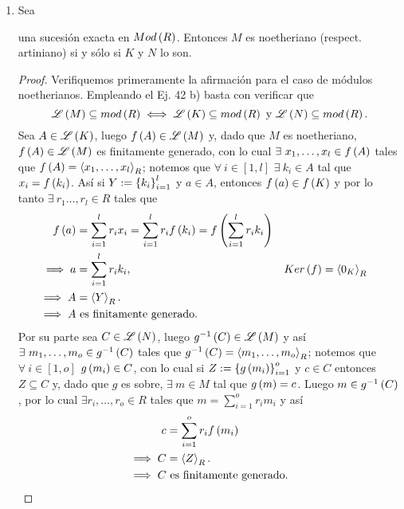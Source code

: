 \documentclass{article}
\begin{document}
\begin{enumerate}[label=\textbf{Ej \arabic*.}]
		\item Sea
		\begin{center}
		\end{center} 
		una sucesión exacta en $Mod\left(R\right)$. Entonces $M$ es noetheriano (respect. artiniano) si y sólo si $K$ y $N$ lo son.
		\begin{proof}
			Verifiquemos primeramente la afirmación para el caso de módulos noetherianos. Empleando el Ej. 42 b) basta con verificar que 
			\begin{equation*}
				\mathscr{L}\left(M\right)\subseteq mod\left(R\right)\iff \mathscr{L}\left(K\right)\subseteq mod\left(R\right)\text{ y }\mathscr{L}\left(N\right)\subseteq mod\left(R\right).
			\end{equation*}
			\boxed{\implies} Sea $A\in\mathscr{L}\left(K\right)$, luego $f\left(A\right)\in\mathscr{L}\left(M\right)$ y, dado que $M$ es noetheriano, $f\left(A\right)\in\mathscr{L}\left(M\right)$ es finitamente generado, con lo cual $\exists\ x_1,\dotsc,x_l\in f\lrprth{A}$ tales que $f\left(A\right)=\left< x_1,\dotsc,x_l\right>_{R}$; notemos que $\forall\ i\in[1,l]$ $\exists\ k_i\in A$ tal que $x_i=f\left(k_i\right)$. Así si $Y:={\left\{{k}_{i}\right\}}_{i=1}^{l}$ y $a\in A$, entonces $f\left(a\right)\in f\left(K\right)$ y por lo tanto $\exists\ r_1\dots,r_l\in R$ tales que
			\begin{align*}
				f\left(a\right)&=\sum_{i=1}^{l}r_ix_i=\sum_{i=1}^{l}r_if\left(k_i\right)=f\left(\sum_{i=1}^{l}r_ik_i\right)\\
				\implies a&=\sum_{i=1}^{l}r_ik_i, && Ker\left(f\right)=\left< 0_K\right>_{R}\\
				\implies A&=\left< Y\right>_{R}.\\
				\implies A&\text{ es finitamente generado}.
			\end{align*} 
			Por su parte sea $C\in\mathscr{L}\left(N\right)$, luego $g^{-1}\left(C\right)\in\mathscr{L}\left(M\right)$ y así $\exists\ m_1,\dotsc,m_o\in g^{-1}\left(C\right)$ tales que $g^{-1}\left(C\right)=\left< m_1,\dotsc,m_o\right>_{R}$; notemos que $\forall\ i\in[1,o]$ $g\left(m_i\right)\in C$, con lo cual  si $Z:=\left\{g\left(m_i\right)\right\}_{i=1}^{o}$ y $c\in C$ entonces $Z\subseteq C$ y, dado que $g$ es sobre, $\exists\ m\in M$ tal que $g\left(m\right)=c$. Luego $m\in g^{-1}\left(C\right)$, por lo cual $\exists r_i,\dotsc,r_o\in R$ tales que $m= \sum_{i=1}^{o}r_im_i$ y así
			\begin{align*}
				c&=\sum_{i=1}^{o}r_if\lrprth{m_i}\\
				\implies C&=\genmod{Z}{R}.\\
				\implies C&\text{ es finitamente generado}.

\end{align*}
\end{proof}
\end{enumerate}
\end{document}
